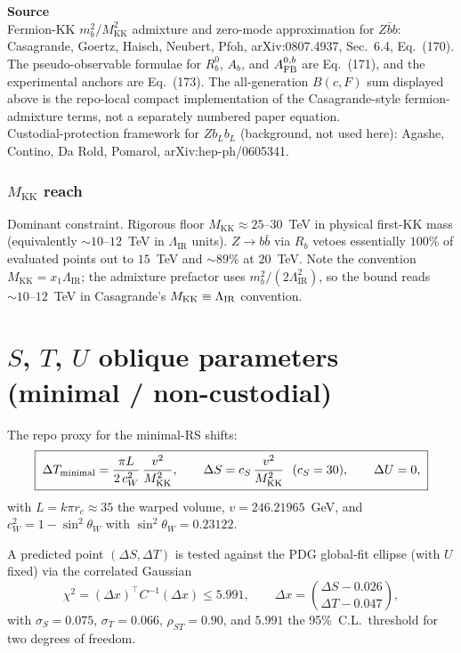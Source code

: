 \documentclass[11pt]{article}
\newcommand{\MKK}{M_{\mathrm{KK}}}
\newcommand{\LIR}{\Lambda_{\mathrm{IR}}}
\newcommand{\cwsq}{c_W^2}
\newenvironment{srcbox}{\begin{srcboxframe}\small\raggedright\sloppy}{\end{srcboxframe}}
\begin{document}
\begin{srcbox}
\textbf{Source}\\[2pt]
Fermion-KK $m_b^2/\MKK^2$ admixture and zero-mode approximation for
$Z\bar b b$: Casagrande, Goertz, Haisch, Neubert, Pfoh, arXiv:0807.4937,
Sec.~6.4, Eq.~(170). The pseudo-observable formulae for $R_b^0$, $A_b$, and
$A_{\rm FB}^{0,b}$ are Eq.~(171), and the experimental anchors are Eq.~(173).
The all-generation $B(c,F)$ sum displayed above is the repo-local compact
implementation of the Casagrande-style fermion-admixture terms, not a
separately numbered paper equation.\\[2pt]
Custodial-protection framework for $Zb_Lb_L$ (background,
not used here): Agashe, Contino, Da Rold, Pomarol, arXiv:hep-ph/0605341.
\end{srcbox}

\subsubsection*{$\MKK$ reach}
\noindent Dominant constraint. Rigorous floor
$\MKK\approx25$--$30$~TeV in physical first-KK mass (equivalently $\sim10$--$12$~TeV
in $\LIR$ units). $Z\to b\bar b$ via $R_b$ vetoes essentially $100\%$ of evaluated
points out to $15$~TeV and $\sim89\%$ at $20$~TeV. Note the convention $\MKK=x_1\LIR$; the admixture prefactor
uses $m_b^2/(2\LIR^2)$, so the bound reads $\sim10$--$12$~TeV in Casagrande's
$M_{\rm KK}\equiv\LIR$ convention.

\bigskip
\section*{$S$, $T$, $U$ oblique parameters (minimal / non-custodial)}

\noindent The repo proxy for the minimal-RS shifts:
\begin{equation}
\boxed{\;
\Delta T_{\rm minimal}=\frac{\pi L}{2\,\cwsq}\,\frac{v^2}{\MKK^2},
\qquad
\Delta S=c_S\,\frac{v^2}{\MKK^2}\ \ (c_S=30),
\qquad
\Delta U=0,
\;}
\end{equation}
with $L=k\pi r_c\approx35$ the warped volume, $v=246.21965$~GeV, and $\cwsq=1-\sin^2\theta_W$
with $\sin^2\theta_W=0.23122$.

A predicted point $(\Delta S,\Delta T)$ is tested against
the PDG global-fit ellipse (with $U$ fixed) via the correlated Gaussian
\begin{equation}
\boxed{\;
\chi^2=(\Delta x)^\top C^{-1}(\Delta x)\le 5.991,
\qquad
\Delta x=\binom{\Delta S-0.026}{\Delta T-0.047},
\;}
\end{equation}
with $\sigma_S=0.075$, $\sigma_T=0.066$, $\rho_{ST}=0.90$, and $5.991$ the
95\%~C.L.\ threshold for two degrees of freedom.
\end{document}
